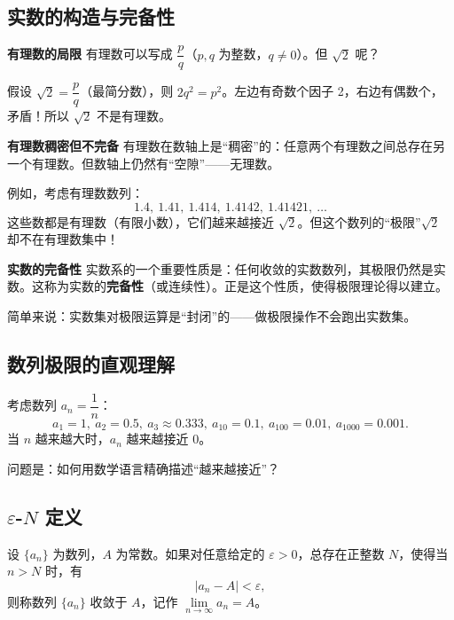 \documentclass{ctexart}
\newenvironment{custom}[1]{\par\noindent \textbf{#1}\quad}{\par\vspace{1em}}
\begin{document}
\subsection{实数的构造与完备性}

\begin{custom}{有理数的局限}
有理数可以写成 \(\dfrac{p}{q}\)（\(p,q\) 为整数，\(q \neq 0\)）。但 \(\sqrt{2}\) 呢？

假设 \(\sqrt{2} = \dfrac{p}{q}\)（最简分数），则 \(2q^2 = p^2\)。左边有奇数个因子 2，右边有偶数个，矛盾！所以 \(\sqrt{2}\) 不是有理数。
\end{custom}

\begin{custom}{有理数稠密但不完备}
有理数在数轴上是“稠密”的：任意两个有理数之间总存在另一个有理数。但数轴上仍然有“空隙”——无理数。

例如，考虑有理数数列：
\[
1.4,\ 1.41,\ 1.414,\ 1.4142,\ 1.41421,\ \dots
\]
这些数都是有理数（有限小数），它们越来越接近 \(\sqrt{2}\)。但这个数列的“极限”\(\sqrt{2}\) 却不在有理数集中！
\end{custom}

\begin{custom}{实数的完备性}
实数系的一个重要性质是：任何收敛的实数数列，其极限仍然是实数。这称为实数的\textbf{完备性}（或连续性）。正是这个性质，使得极限理论得以建立。

简单来说：实数集对极限运算是“封闭”的——做极限操作不会跑出实数集。
\end{custom}

\subsection{数列极限的直观理解}

考虑数列 \(a_n = \dfrac{1}{n}\)：
\[
a_1=1,\ a_2=0.5,\ a_3\approx 0.333,\ a_{10}=0.1,\ a_{100}=0.01,\ a_{1000}=0.001.
\]
当 \(n\) 越来越大时，\(a_n\) 越来越接近 0。

问题是：如何用数学语言精确描述“越来越接近”？

\subsection{\(\varepsilon\)-\(N\) 定义}

\begin{definition}[数列极限]
设 \(\{a_n\}\) 为数列，\(A\) 为常数。如果对任意给定的 \(\varepsilon > 0\)，总存在正整数 \(N\)，使得当 \(n > N\) 时，有
\[
|a_n - A| < \varepsilon,
\]
则称数列 \(\{a_n\}\) 收敛于 \(A\)，记作 \(\lim\limits_{n\to\infty} a_n = A\)。
\end{definition}
\end{document}
